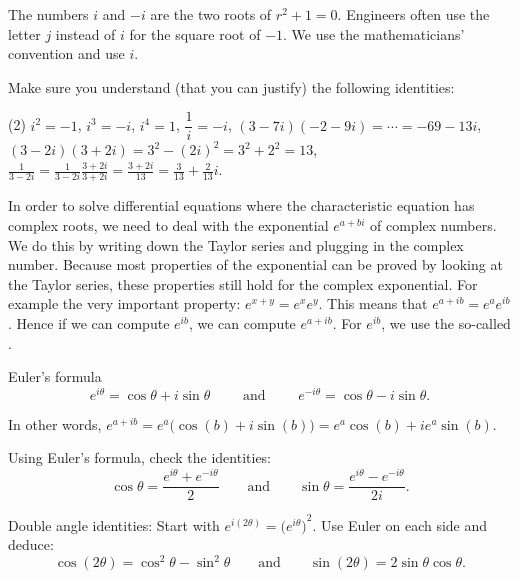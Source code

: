 The numbers
$i$ and $-i$ are the two roots of $r^2 + 1 = 0$.
Engineers often use the letter $j$ instead of $i$ for the square
root of $-1$.  We use the mathematicians' convention and use $i$.

\begin{exercise}
Make sure you understand (that you can justify)
the following identities:
\begin{tasks}(2)
\task $i^2 = -1$, $i^3 = -i$, $i^4 = 1$,
\task $\dfrac{1}{i} = -i$,
\task $(3-7i)(-2-9i) = \cdots = -69-13i$,
\task $(3-2i)(3+2i) = 3^2 - {(2i)}^2 = 3^2 + 2^2 = 13$,
\task $\frac{1}{3-2i} = \frac{1}{3-2i} \frac{3+2i}{3+2i} = \frac{3+2i}{13}
= \frac{3}{13}+\frac{2}{13}i$.
\end{tasks}
\end{exercise}

\pagebreak[2]
In order to solve differential equations where the characteristic equation has complex roots, we need to deal with the exponential $e^{a+bi}$ of complex numbers. 
We do this by writing down the Taylor series and plugging in the complex
number.  Because most properties of the exponential can be proved by looking
at the Taylor series, these
properties still hold for the complex
exponential.  For example the very important property: $e^{x+y} = e^x e^y$.  This means that
$e^{a+ib} = e^a e^{ib}$.  Hence if we can compute $e^{ib}$, we can
compute $e^{a+ib}$.  For $e^{ib}$, we use the so-called
\emph{}.

\begin{theorem1}[eulersformula]{Euler's formula} 
\begin{equation*}
e^{i \theta} = \cos \theta + i \sin \theta
\qquad \text{ and } \qquad
e^{- i \theta} = \cos \theta - i \sin \theta .
\end{equation*}
\end{theorem1}

In other words, $e^{a+ib} = e^a \bigl( \cos(b) + i \sin(b) \bigr) = e^a \cos(b) + i e^a \sin(b)$.

\begin{exercise}
Using Euler's formula, check the identities:
\begin{equation*}
\cos \theta = \frac{e^{i \theta} + e^{-i \theta}}{2}
\qquad \text{and} \qquad
\sin \theta = \frac{e^{i \theta} - e^{-i \theta}}{2i}.
\end{equation*}
\end{exercise}

\begin{exercise}
Double angle identities:
Start with $e^{i(2\theta)} = {\bigl(e^{i \theta} \bigr)}^2$.  Use Euler on
each side and deduce:
\begin{equation*}
\cos (2\theta) = \cos^2 \theta - \sin^2 \theta
\qquad \text{and} \qquad
\sin (2\theta) = 2 \sin \theta \cos \theta .
\end{equation*}
\end{exercise}

